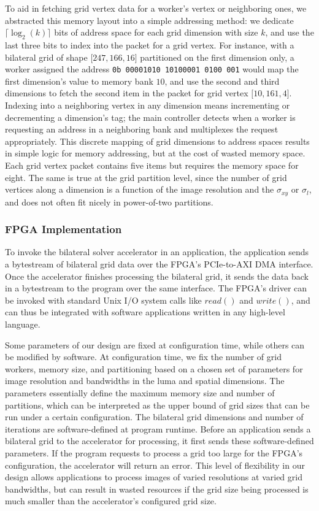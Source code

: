 To aid in fetching grid vertex data for a worker's vertex or neighboring ones, we abstracted this memory layout into a simple addressing method: we dedicate $\lceil\log_2(k)\rceil$ bits of address space for each grid dimension with size  $k$, and use the last three bits to index into the packet for a grid vertex.
For instance, with a bilateral grid of shape $\big[ 247, 166, 16\big]$ partitioned on the first dimension only, a worker assigned the address \texttt{0b 00001010 10100001 0100 001} would map the first dimension's value to memory bank $10$, and use the second and third dimensions to fetch the second item in the packet for grid vertex $\big[ 10, 161, 4\big]$.
Indexing into a neighboring vertex in any dimension means incrementing or decrementing a dimension's tag; the main controller detects when a worker is requesting an address in a neighboring bank and multiplexes the request appropriately.
This discrete mapping of grid dimensions to address spaces results in simple logic for memory addressing, but at the cost of wasted memory space. 
Each grid vertex packet contains five items but requires the memory space for eight.
The same is true at the grid partition level, since the number of grid vertices along a dimension is a function of the image resolution and the $\sigma_{xy}$ or $\sigma_{l}$, and does not often fit nicely in power-of-two partitions. 



\subsubsection{FPGA Implementation}

To invoke the bilateral solver accelerator in an application, the application sends a bytestream of bilateral grid data over the FPGA's PCIe-to-AXI DMA interface. 
Once the accelerator finishes processing the bilateral grid, it sends the data back in a bytestream to the program over the same interface.
The FPGA's driver can be invoked with standard Unix I/O system calls like $read()$ and $write()$, and can thus be integrated with software applications written in any high-level language. 

Some parameters of our design are fixed at configuration time, while others can be modified by software. 
At configuration time, we fix the number of grid workers, memory size, and partitioning based on a chosen set of parameters for image resolution and bandwidths in the luma and spatial dimensions.
The parameters essentially define the maximum memory size and number of partitions, which can be interpreted as the upper bound of grid sizes that can be run under a certain configuration.
The bilateral grid dimensions and number of iterations are software-defined at program runtime.
Before an application sends a bilateral grid to the accelerator for processing, it first sends these software-defined parameters.
If the program requests to process a grid too large for the FPGA's configuration, the accelerator will return an error. 
This level of flexibility in our design allows applications to process images of varied resolutions at varied grid bandwidths, but can result in wasted resources if the grid size being processed is much smaller than the accelerator's configured grid size.


